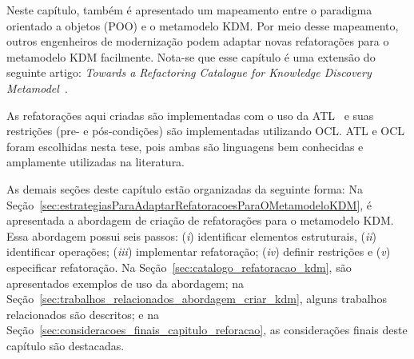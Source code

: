 Neste capítulo, também é apresentado um mapeamento entre o paradigma orientado a objetos (POO) e o metamodelo KDM. Por meio desse mapeamento, outros engenheiros de modernização podem adaptar novas refatorações para o metamodelo KDM facilmente. Nota-se que esse capítulo é uma extensão do seguinte artigo: \textit{Towards a Refactoring Catalogue for Knowledge Discovery Metamodel}~\cite{durelli_catalogo}.





As refatorações aqui criadas são implementadas com o uso da ATL~\cite{Allilaire_06, Jouault_2005, Jouault_2008} e suas restrições (pre- e pós-condições) são implementadas utilizando OCL. ATL e OCL foram escolhidas nesta tese, pois ambas são linguagens bem conhecidas e amplamente utilizadas na literatura.%

As demais seções deste capítulo estão organizadas da seguinte forma: Na Seção~\ref{sec:estrategiasParaAdaptarRefatoracoesParaOMetamodeloKDM}, é apresentada a abordagem de criação de refatorações para o metamodelo KDM. Essa abordagem possui seis passos: (\textit{i}) identificar elementos estruturais, (\textit{ii}) identificar operações; (\textit{iii}) implementar refatoração; (\textit{iv}) definir restrições e (\textit{v}) especificar refatoração. Na Seção~\ref{sec:catalogo_refatoracao_kdm}, são apresentados exemplos de uso da abordagem; na Seção~\ref{sec:trabalhos_relacionados_abordagem_criar_kdm}, alguns trabalhos relacionados são descritos; e na Seção~\ref{sec:consideracoes_finais_capitulo_reforacao}, as considerações finais deste capítulo são destacadas.

